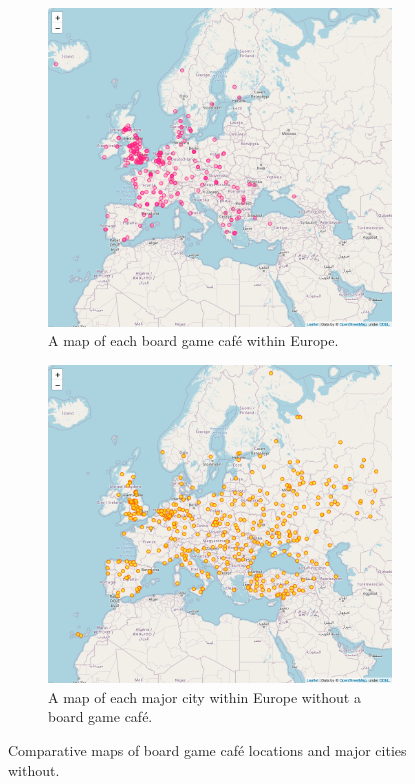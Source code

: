 \documentclass{article}
\begin{document}
    \begin{figure}[t]
        \centering
        \begin{subfigure}{0.49\textwidth}
            \centering
            \includegraphics[width=\textwidth]{Map_eu_cafe.png}
            \caption{\label{fig:MapEUCafe}A map of each board game caf\'e within Europe.}
        \end{subfigure}
        \hfill
        \begin{subfigure}{0.49\textwidth}
            \centering
            \includegraphics[width=\textwidth]{Map_eu_cwc.png}
            \caption{\label{fig:MapEUCity}A map of each major city within Europe without a board game caf\'e.}
        \end{subfigure}
        \caption{\label{fig:MapEUComp}Comparative maps of board game caf\'e locations and major cities without.}
    \end{figure}
\end{document}
